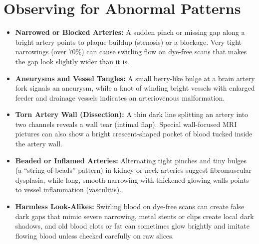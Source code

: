 \section{Observing for Abnormal Patterns}
\begin{itemize}
\item \textbf{Narrowed or Blocked Arteries:} A sudden pinch or missing gap along a bright artery points to plaque buildup (stenosis) or a blockage. Very tight narrowings (over 70\%) can cause swirling flow on dye-free scans that makes the gap look slightly wider than it is.
\item \textbf{Aneurysms and Vessel Tangles:} A small berry-like bulge at a brain artery fork signals an aneurysm, while a knot of winding bright vessels with enlarged feeder and drainage vessels indicates an arteriovenous malformation.
\item \textbf{Torn Artery Wall (Dissection):} A thin dark line splitting an artery into two channels reveals a wall tear (intimal flap). Special wall-focused MRI pictures can also show a bright crescent-shaped pocket of blood tucked inside the artery wall.
\item \textbf{Beaded or Inflamed Arteries:} Alternating tight pinches and tiny bulges (a ``string-of-beads'' pattern) in kidney or neck arteries suggest fibromuscular dysplasia, while long, smooth narrowing with thickened glowing walls points to vessel inflammation (vasculitis).
\item \textbf{Harmless Look-Alikes:} Swirling blood on dye-free scans can create false dark gaps that mimic severe narrowing, metal stents or clips create local dark shadows, and old blood clots or fat can sometimes glow brightly and imitate flowing blood unless checked carefully on raw slices.
\end{itemize}

